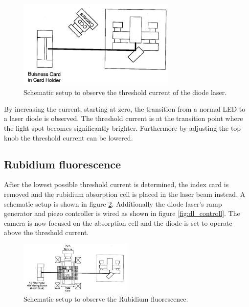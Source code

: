 \begin{figure}
  \centering
  \includegraphics[width=0.7\textwidth]{setup1.png}
  \caption{Schematic setup to observe the threshold current of the diode laser.\cite{V60}}
  \label{fig:setup1}
\end{figure}
By increasing the current, starting at zero, the transition from
a normal LED to a laser diode is observed.
The threshold current is at the
transition point where the light spot becomes significantly brighter.
Furthermore by adjusting the top knob the threshold current can be lowered.


\subsection{Rubidium fluorescence}
\label{subsec:RB_fluorescence}

After the lowest possible threshold current is determined, the
index card is removed and
the rubidium absorption cell
is placed in the laser beam instead.
A schematic setup is shown in figure \ref{fig:setup2}.
Additionally the diode laser's ramp generator and  piezo controller is wired as shown in figure \ref{fig:dl_controll}.
The camera is now
focused on the absorption cell and
the diode is set to operate above the threshold current.
\begin{figure}
  \centering
  \includegraphics[width=0.5\textwidth]{setup2.png}
  \caption{Schematic setup to observe the Rubidium fluorescence.\cite{V60}}
  \label{fig:setup2}
\end{figure}

